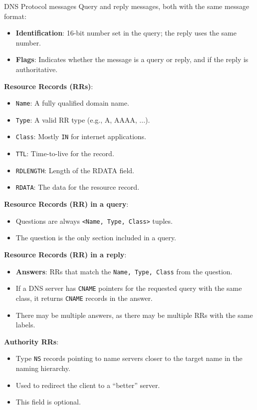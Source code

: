 \begin{knBox}
    {DNS Protocol messages}
    Query and reply messages, both with the same message format:

    \begin{itemize}
        \item \textbf{Identification}: 16-bit number set in the query; the reply uses the same number.
        \item \textbf{Flags}: Indicates whether the message is a query or reply, and if the reply is authoritative.
    \end{itemize}

    \textbf{Resource Records (RRs)}:
    \begin{itemize}
        \item \texttt{Name}: A fully qualified domain name.
        \item \texttt{Type}: A valid RR type (e.g., A, AAAA, ...).
        \item \texttt{Class}: Mostly \texttt{IN} for internet applications.
        \item \texttt{TTL}: Time-to-live for the record.
        \item \texttt{RDLENGTH}: Length of the RDATA field.
        \item \texttt{RDATA}: The data for the resource record.
    \end{itemize}

    \textbf{Resource Records (RR) in a query}:
    \begin{itemize}
        \item Questions are always \texttt{<Name, Type, Class>} tuples.
        \item The question is the only section included in a query.
    \end{itemize}

    \textbf{Resource Records (RR) in a reply}:
    \begin{itemize}
        \item \textbf{Answers}: RRs that match the \texttt{Name, Type, Class} from the question.
        \item If a DNS server has \texttt{CNAME} pointers for the requested query with the same class, it returns \texttt{CNAME} records in the answer.
        \item There may be multiple answers, as there may be multiple RRs with the same labels.
    \end{itemize}

    \textbf{Authority RRs}:
    \begin{itemize}
        \item Type \texttt{NS} records pointing to name servers closer to the target name in the naming hierarchy.
        \item Used to redirect the client to a “better” server.
        \item This field is optional.
    \end{itemize}


\end{knBox}
